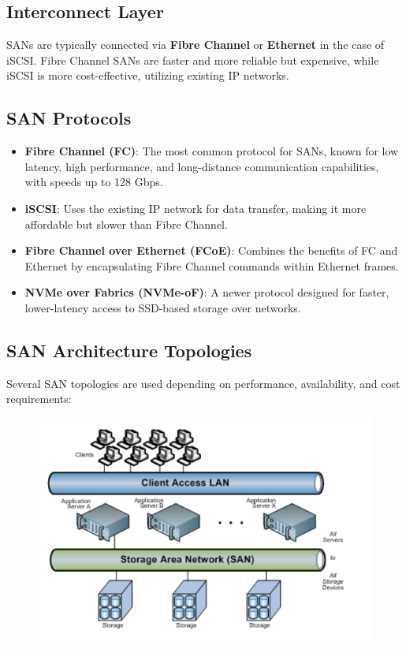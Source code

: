 \documentclass{article}
\begin{document}
\subsection{Interconnect Layer}
SANs are typically connected via \textbf{Fibre Channel} or \textbf{Ethernet} in the case of iSCSI. Fibre Channel SANs are faster and more reliable but expensive, while iSCSI is more cost-effective, utilizing existing IP networks.

\subsection{SAN Protocols}

\begin{itemize}
    \item \textbf{Fibre Channel (FC)}: The most common protocol for SANs, known for low latency, high performance, and long-distance communication capabilities, with speeds up to 128 Gbps.
    \item \textbf{iSCSI}: Uses the existing IP network for data transfer, making it more affordable but slower than Fibre Channel.
    \item \textbf{Fibre Channel over Ethernet (FCoE)}: Combines the benefits of FC and Ethernet by encapsulating Fibre Channel commands within Ethernet frames.
    \item \textbf{NVMe over Fabrics (NVMe-oF)}: A newer protocol designed for faster, lower-latency access to SSD-based storage over networks.
\end{itemize}

\subsection{SAN Architecture Topologies}
Several SAN topologies are used depending on performance, availability, and cost requirements:

\begin{figure}[H]
    \centering
    \includegraphics[scale=0.5]{pictures/SAN.png}
\end{figure}
\end{document}
